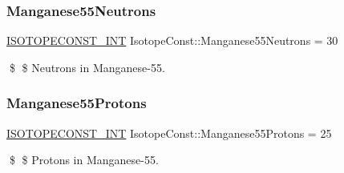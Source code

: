 \subsubsection{\texorpdfstring{Manganese55\+Neutrons}{Manganese55Neutrons}}
{\footnotesize\ttfamily \mbox{\hyperlink{group___isotope_const-_macros_ga5f18360b3e99483a35c32d789e62621c}{I\+S\+O\+T\+O\+P\+E\+C\+O\+N\+S\+T\+\_\+\+I\+NT}} Isotope\+Const\+::\+Manganese55\+Neutrons = 30}

\$ \$ Neutrons in Manganese-\/55. \mbox{\label{group___isotope_const-_manganese-_mn55_ga06f71f245ec2cff58eac56c8b6e3cd71}} 
\subsubsection{\texorpdfstring{Manganese55\+Protons}{Manganese55Protons}}
{\footnotesize\ttfamily \mbox{\hyperlink{group___isotope_const-_macros_ga5f18360b3e99483a35c32d789e62621c}{I\+S\+O\+T\+O\+P\+E\+C\+O\+N\+S\+T\+\_\+\+I\+NT}} Isotope\+Const\+::\+Manganese55\+Protons = 25}

\$ \$ Protons in Manganese-\/55. 